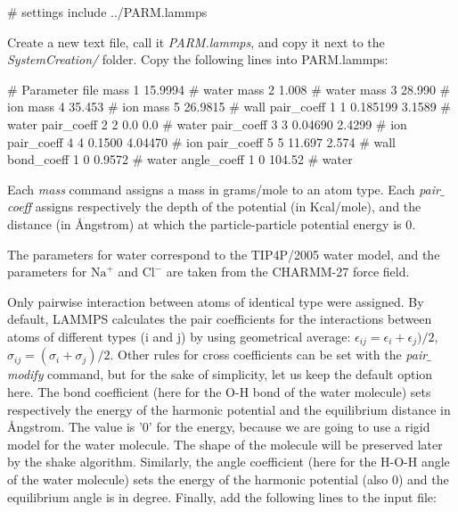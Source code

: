 \begin{lcverbatim}
# settings
include ../PARM.lammps
\end{lcverbatim}

\noindent Create a new text file, call it \textit{PARM.lammps}, and copy it
next to the \textit{SystemCreation/} folder. Copy the following lines
into PARM.lammps:

\begin{lcverbatim}
# Parameter file
mass 1 15.9994 # water
mass 2 1.008 # water
mass 3 28.990 # ion
mass 4 35.453 # ion
mass 5 26.9815 # wall
pair_coeff 1 1 0.185199 3.1589 # water
pair_coeff 2 2 0.0 0.0 # water
pair_coeff 3 3 0.04690 2.4299 # ion
pair_coeff 4 4 0.1500 4.04470 # ion
pair_coeff 5 5 11.697 2.574 # wall
bond_coeff 1 0 0.9572 # water
angle_coeff 1 0 104.52 # water

\end{lcverbatim}

\noindent Each \textit{mass} command assigns a mass in grams/mole to an atom type. Each
\textit{pair$\_$coeff} assigns respectively the depth of the potential
(in Kcal/mole), and the distance (in Ångstrom) at which the
particle-particle potential energy is 0.

\begin{tcolorbox}[colback=mylightblue!5!white,colframe=mylightblue!75!black,title=About the parameters]
The parameters for water
correspond to the TIP4P/2005 water model, and the parameters
for $\text{Na}^+$ and $\text{Cl}^-$  are
taken from the CHARMM-27 force field.
\end{tcolorbox}

\noindent Only pairwise interaction between atoms of
identical type were assigned. By default, LAMMPS calculates
the pair coefficients for the interactions between atoms
of different types (i and j) by using geometrical
average: $\epsilon_{ij} = \epsilon_i + \epsilon_j)/2$, 
$\sigma_{ij} = (\sigma_i + \sigma_j)/2.$
Other rules for cross coefficients can be set with the
\textit{pair$\_$modify} command, but for the sake of simplicity,
let us keep the default option here.
The bond coefficient (here for the O-H bond of the water
molecule) sets respectively the energy of the harmonic
potential and the equilibrium distance in Ångstrom. The
value is '0' for the energy, because we are going to use a
rigid model for the water molecule. The shape of the
molecule will be preserved later by the shake algorithm.
Similarly, the angle coefficient (here for the H-O-H angle
of the water molecule) sets the energy of the harmonic
potential (also 0) and the equilibrium angle is in degree.
Finally, add the following lines to the input file:

